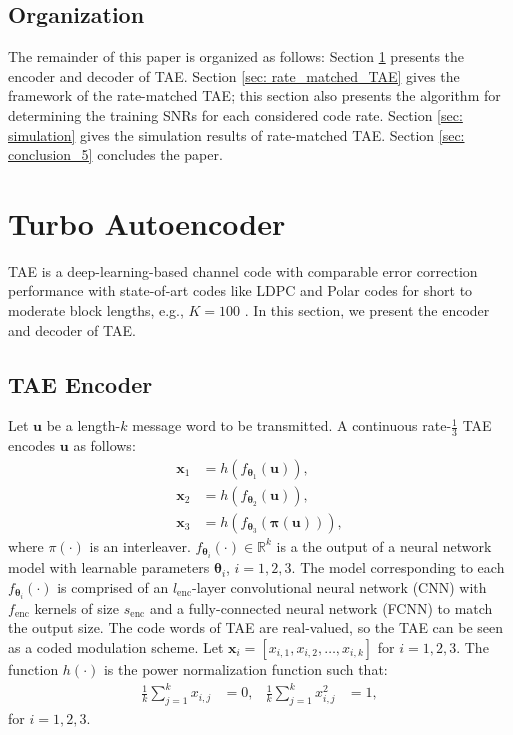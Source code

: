 \documentclass [PhD] {uclathes}
\begin{document}
\subsection{Organization}
The remainder of this paper is organized as follows: Section \ref{sec: auto_enc} presents the encoder and decoder of TAE. Section \ref{sec: rate_matched_TAE} gives the framework of the rate-matched TAE; this section also presents the algorithm for determining the training SNRs for each considered code rate. Section \ref{sec: simulation} gives the simulation results of rate-matched TAE.  Section \ref{sec: conclusion_5} concludes the paper. 

\section{Turbo Autoencoder}\label{sec: auto_enc}
TAE is a deep-learning-based channel code with comparable error correction performance with state-of-art codes like LDPC and Polar codes for short to moderate block lengths, e.g., $K=100$ \cite{jiang2019turbo}. 
In this section, we present the encoder and decoder of TAE. 

\subsection{TAE Encoder}
Let $\mathbf{u}$ be a length-$k$ message word to be transmitted. A continuous rate-$\frac{1}{3}$ TAE encodes $\mathbf{u}$ as follows:
\begin{align*}
   \mathbf{x}_1&=h\left(f_{{\boldsymbol\theta}_1}(\mathbf{u})\right), \\
   \mathbf{x}_2&=h\left(f_{{\boldsymbol\theta}_2}(\mathbf{u})\right), \\
   \mathbf{x}_3&=h\left(f_{{\boldsymbol\theta}_3}(\mathbf{\pi(u)})\right),
\end{align*}
where $\pi(\cdot)$ is an interleaver. $f_{{\boldsymbol\theta}_i}(\cdot)\in\mathbb{R}^{k}$ is a the output of a neural network model with learnable parameters  ${\boldsymbol\theta}_i$, $i=1,2,3$. The model corresponding to each $f_{\boldsymbol\theta_i}(\cdot)$ is comprised of an  $l_{\text{enc}}$-layer convolutional neural network (CNN) with  $f_{\text{enc}}$  kernels of size $s_{\text{enc}}$ and a fully-connected neural network (FCNN) to match the output size. The code words of TAE are real-valued, so the TAE can be seen as a coded modulation scheme. Let $\mathbf{x}_i=[x_{i,1},x_{i,2},\allowbreak\ldots,x_{i,k}]$ for $i=1,2,3$. The function $h(\cdot)$ is the power normalization function \cite{jiang2019turbo} such that:
\begin{align}
    \frac{1}{k}\sum_{j=1}^{k}x_{i,j}&=0,&
    \frac{1}{k}\sum_{j=1}^{k}x^2_{i,j}&=1\label{equ: power_normalization},
\end{align} 
for $i=1,2,3$. 
\end{document}
